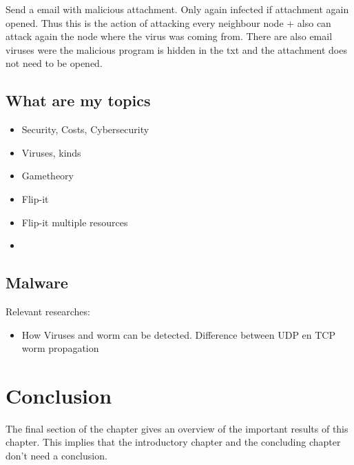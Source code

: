 Send a email with malicious attachment. Only again infected if attachment again opened. Thus this is the action of attacking every neighbour node + also can attack again the node where the virus was coming from.
There are also email viruses were the malicious program is hidden in the txt and the attachment does not need to be opened. 



\subsection{What are my topics}
\begin{itemize}
\item Security, Costs, Cybersecurity
\item Viruses, kinds
\item Gametheory
\item Flip-it
\item Flip-it multiple resources
\item 
\end{itemize}

\subsection{Malware}
Relevant researches:
\begin{itemize}
\item How Viruses and worm can be detected. Difference between UDP en TCP worm propagation
\end{itemize}




\section{Conclusion}
\label{Cha:1:Conclusion}
The final section of the chapter gives an overview of the important results
of this chapter. This implies that the introductory chapter and the
concluding chapter don't need a conclusion.



%
